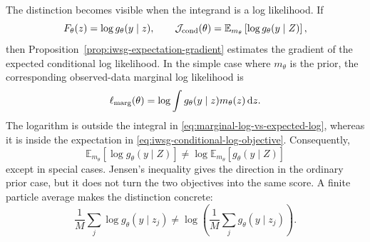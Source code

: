 \documentclass[11pt]{article}
\newcommand{\dd}{\mathrm{d}}
\begin{document}
The distinction becomes visible when the integrand is a log likelihood. If
\begin{equation}
 F_\theta(z)=\log g_\theta(y\mid z),
 \qquad
 \mathcal J_{\rm cond}(\theta)
 =\mathbb E_{m_\theta}\left[\log g_\theta(y\mid Z)\right],
 \label{eq:iwsg-conditional-log-objective}
\end{equation}
then Proposition~\ref{prop:iwsg-expectation-gradient} estimates the gradient
of the expected conditional log likelihood. In the simple case where
$m_\theta$ is the prior, the corresponding observed-data marginal log
likelihood is
\begin{equation}
 \ell_{\rm marg}(\theta)
 =\log\int g_\theta(y\mid z)m_\theta(z)\,\dd z.
 \label{eq:marginal-log-vs-expected-log}
\end{equation}
The logarithm is outside the integral in
\eqref{eq:marginal-log-vs-expected-log}, whereas it is inside the expectation
in \eqref{eq:iwsg-conditional-log-objective}. Consequently,
\begin{equation}
 \mathbb E_{m_\theta}[\log g_\theta(y\mid Z)]
 \ne
 \log\mathbb E_{m_\theta}[g_\theta(y\mid Z)]
 \label{eq:expected-log-not-log-expectation}
\end{equation}
except in special cases. Jensen's inequality gives the direction in the
ordinary prior case, but it does not turn the two objectives into the same
score. A finite particle average makes the distinction concrete:
\begin{equation}
 \frac1M\sum_j\log g_\theta(y\mid z_j)
 \ne
 \log\left(\frac1M\sum_j g_\theta(y\mid z_j)\right).
 \label{eq:finite-log-order}
\end{equation}
\end{document}
